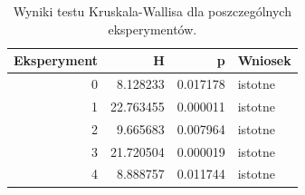 \begin{table}
\caption{Wyniki testu Kruskala-Wallisa dla poszczególnych eksperymentów.}
\label{tab:kruskal_exp}
\begin{tabular}{rrrl}
\toprule
Eksperyment & H & p & Wniosek \\
\midrule
0 & 8.128233 & 0.017178 & istotne \\
1 & 22.763455 & 0.000011 & istotne \\
2 & 9.665683 & 0.007964 & istotne \\
3 & 21.720504 & 0.000019 & istotne \\
4 & 8.888757 & 0.011744 & istotne \\
\bottomrule
\end{tabular}
\end{table}
